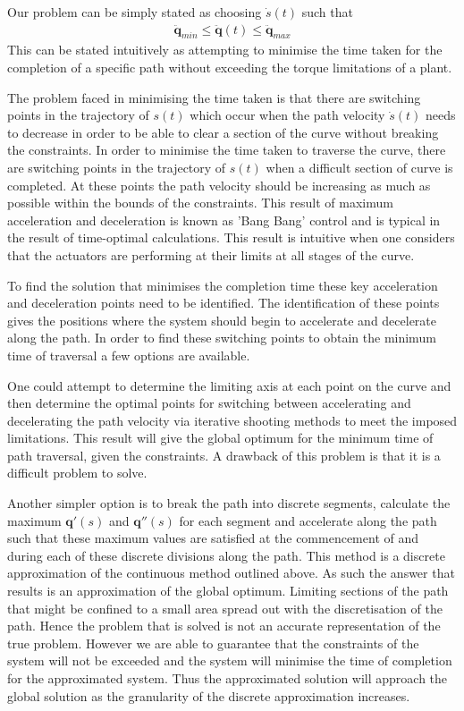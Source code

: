 Our problem can be simply stated as choosing $\dot{s}(t)$ such that 
\begin{align*}
\ddot{\textbf{q}}_{min} \leq \ddot{\textbf{q}}(t) \leq \ddot{\textbf{q}}_{max}
\end{align*} 
This can be stated intuitively as attempting to minimise the time taken for the completion of a specific path without exceeding the torque limitations of a plant.

The problem faced in minimising the time taken is that there are switching points in the trajectory of $s(t)$ which occur when the path velocity $\dot{s}(t)$ needs to decrease in order to be able to clear a section of the curve without breaking the constraints. In order to minimise the time taken to traverse the curve, there are switching points in the trajectory of $s(t)$ when a difficult section of curve is completed. At these points the path velocity should be increasing as much as possible within the bounds of the constraints. This result of maximum acceleration and deceleration is known as 'Bang Bang' control and is typical in the result of time-optimal calculations. This result is intuitive when one considers that the actuators are performing at their limits at all stages of the curve.
 
To find the solution that minimises the completion time these key acceleration and deceleration points need to be identified. The identification of these points gives the positions where the system should begin to accelerate and decelerate along the path.
In order to find these switching points to obtain the minimum time of traversal a few options are available.

One could attempt to determine the limiting axis at each point on the curve and then determine the optimal points for switching between accelerating and decelerating the path velocity via iterative shooting methods to meet the imposed limitations. This result will give the global optimum for the minimum time of path traversal, given the constraints. A drawback of this problem is that it is a difficult problem to solve.

Another simpler option is to break the path into discrete segments, calculate the maximum $\textbf{q}'(s)$ and $\textbf{q}''(s)$ for each segment and accelerate along the path such that these maximum values are satisfied at the commencement of and during each of these discrete divisions along the path. This method is a discrete approximation of the continuous method outlined above. As such the answer that results is an approximation of the global optimum. Limiting sections of the path that might be confined to a small area spread out with the discretisation of the path. Hence the problem that is solved is not an accurate representation of the true problem. However we are able to guarantee that the constraints of the system will not be exceeded and the system will minimise the time of completion for the approximated system. Thus the approximated solution will approach the global solution as the granularity of the discrete approximation increases.


